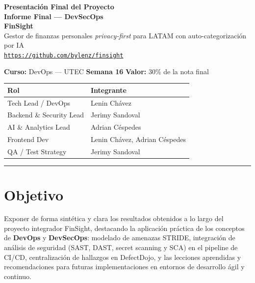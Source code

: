 \documentclass[11pt,a4paper]{article}
\begin{document}
\begin{center}
  {\LARGE\bfseries\color{ink} Presentación Final del Proyecto}\\[4pt]
  {\large\bfseries Informe Final --- DevSecOps}\\[14pt]
  {\Huge\bfseries\color{accent} FinSight}\\[6pt]
  {\normalsize Gestor de finanzas personales \emph{privacy-first} para LATAM con auto-categorización por IA}\\[10pt]
  \href{https://github.com/bylenz/finsight}{\texttt{https://github.com/bylenz/finsight}}\\[14pt]
\end{center}

\noindent\textbf{Curso:} DevOps --- UTEC \quad\textbullet\quad \textbf{Semana 16} \quad\textbullet\quad \textbf{Valor:} 30\% de la nota final

\vspace{6pt}
\begin{center}
\begin{tabularx}{\linewidth}{@{}l Y@{}}
\toprule
\textbf{Rol} & \textbf{Integrante} \\
\midrule
Tech Lead / DevOps & Lenin Chávez \\
Backend \& Security Lead & Jerimy Sandoval \\
AI \& Analytics Lead & Adrian Céspedes \\
Frontend Dev & Lenin Chávez, Adrian Céspedes \\
QA / Test Strategy & Jerimy Sandoval \\
\bottomrule
\end{tabularx}
\end{center}

\vspace{4pt}
\hrule
\vspace{10pt}

\section{Objetivo}
Exponer de forma sintética y clara los resultados obtenidos a lo largo del proyecto integrador
FinSight, destacando la aplicación práctica de los conceptos de \textbf{DevOps} y \textbf{DevSecOps}:
modelado de amenazas STRIDE, integración de análisis de seguridad (SAST, DAST, secret scanning y
SCA) en el pipeline de CI/CD, centralización de hallazgos en DefectDojo, y las lecciones aprendidas
y recomendaciones para futuras implementaciones en entornos de desarrollo ágil y continuo.
\end{document}
